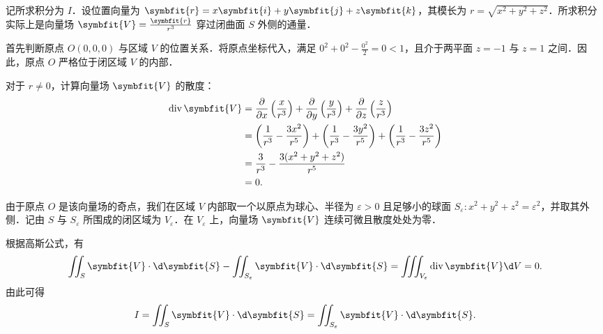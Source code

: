 \begin{solution}
    记所求积分为 $I$．设位置向量为 $\symbfit{r} = x\symbfit{i} + y\symbfit{j} + z\symbfit{k}$，其模长为 $r = \sqrt{x^2+y^2+z^2}$．所求积分实际上是向量场 $\symbfit{V} = \frac{\symbfit{r}}{r^3}$ 穿过闭曲面 $S$ 外侧的通量．

    首先判断原点 $O(0,0,0)$ 与区域 $V$ 的位置关系．将原点坐标代入，满足 $0^2 + 0^2 - \frac{0^2}{2} = 0 < 1$，且介于两平面 $z=-1$ 与 $z=1$ 之间．因此，原点 $O$ 严格位于闭区域 $V$ 的内部．

    对于 $r \neq 0$，计算向量场 $\symbfit{V}$ 的散度：
    \begin{equation}
        \label{eq:div-V}
        \begin{aligned}
            \operatorname{div} \symbfit{V} & = \frac{\partial}{\partial x}\left(\frac{x}{r^3}\right) + \frac{\partial}{\partial y}\left(\frac{y}{r^3}\right) + \frac{\partial}{\partial z}\left(\frac{z}{r^3}\right) \\
                                           & = \left(\frac{1}{r^3} - \frac{3x^2}{r^5}\right) + \left(\frac{1}{r^3} - \frac{3y^2}{r^5}\right) + \left(\frac{1}{r^3} - \frac{3z^2}{r^5}\right)                         \\
                                           & = \frac{3}{r^3} - \frac{3(x^2+y^2+z^2)}{r^5}                                                                                                                            \\
                                           & = 0.
        \end{aligned}
    \end{equation}

    由于原点 $O$ 是该向量场的奇点，我们在区域 $V$ 内部取一个以原点为球心、半径为 $\varepsilon > 0$ 且足够小的球面 $S_\varepsilon \colon x^2+y^2+z^2 = \varepsilon^2$，并取其外侧．记由 $S$ 与 $S_\varepsilon$ 所围成的闭区域为 $V_\varepsilon$．在 $V_\varepsilon$ 上，向量场 $\symbfit{V}$ 连续可微且散度处处为零．

    根据高斯公式，有
    \begin{equation}
        \label{eq:gauss-theorem}
        \iint_S \symbfit{V} \cdot \d\symbfit{S} - \iint_{S_\varepsilon} \symbfit{V} \cdot \d\symbfit{S} = \iiint_{V_\varepsilon} \operatorname{div} \symbfit{V} \d V = 0.
    \end{equation}
    由此可得
    \begin{equation}
        \label{eq:equal-integrals}
        I = \iint_{S} \symbfit{V} \cdot \d\symbfit{S} = \iint_{S_\varepsilon} \symbfit{V} \cdot \d\symbfit{S}.
    \end{equation}


\end{solution}
